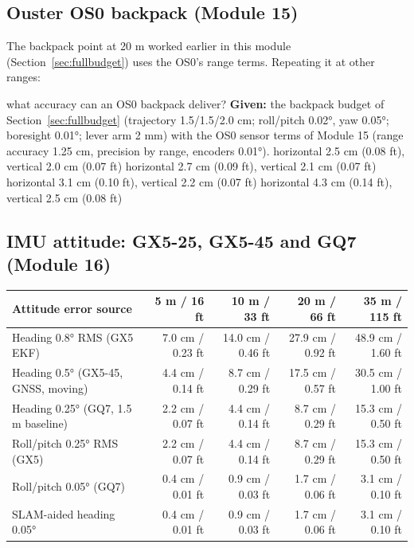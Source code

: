 \subsection{Ouster OS0 backpack (Module 15)}\label{sec:bud-os0}
The backpack point at 20 m worked earlier in this module (Section~\ref{sec:fullbudget}) uses the OS0's range terms. Repeating it at other ranges:

\begin{worked}{what accuracy can an OS0 backpack deliver?}
\textbf{Given:} the backpack budget of Section~\ref{sec:fullbudget} (trajectory 1.5/1.5/2.0 cm; roll/pitch 0.02°, yaw 0.05°; boresight 0.01°; lever arm 2 mm) with the OS0 sensor terms of Module 15 (range accuracy 1.25 cm, precision by range, encoders 0.01°).
 horizontal 2.5 cm (0.08 ft), vertical 2.0 cm (0.07 ft)
 horizontal 2.7 cm (0.09 ft), vertical 2.1 cm (0.07 ft)
 horizontal 3.1 cm (0.10 ft), vertical 2.2 cm (0.07 ft)
 horizontal 4.3 cm (0.14 ft), vertical 2.5 cm (0.08 ft)
\end{worked}


\subsection{IMU attitude: GX5-25, GX5-45 and GQ7 (Module 16)}\label{sec:bud-imu}


\begin{center}\footnotesize
\setlength{\tabcolsep}{3pt}\begin{tabular}{lrrrr}\toprule
\textbf{Attitude error source} & \textbf{5 m / 16 ft} & \textbf{10 m / 33 ft} & \textbf{20 m / 66 ft} & \textbf{35 m / 115 ft}\\\midrule
Heading 0.8° RMS (GX5 EKF) & 7.0 cm / 0.23 ft & 14.0 cm / 0.46 ft & 27.9 cm / 0.92 ft & 48.9 cm / 1.60 ft\\
Heading 0.5° (GX5-45, GNSS, moving) & 4.4 cm / 0.14 ft & 8.7 cm / 0.29 ft & 17.5 cm / 0.57 ft & 30.5 cm / 1.00 ft\\
Heading 0.25° (GQ7, 1.5 m baseline) & 2.2 cm / 0.07 ft & 4.4 cm / 0.14 ft & 8.7 cm / 0.29 ft & 15.3 cm / 0.50 ft\\
Roll/pitch 0.25° RMS (GX5) & 2.2 cm / 0.07 ft & 4.4 cm / 0.14 ft & 8.7 cm / 0.29 ft & 15.3 cm / 0.50 ft\\
Roll/pitch 0.05° (GQ7) & 0.4 cm / 0.01 ft & 0.9 cm / 0.03 ft & 1.7 cm / 0.06 ft & 3.1 cm / 0.10 ft\\
SLAM-aided heading 0.05° & 0.4 cm / 0.01 ft & 0.9 cm / 0.03 ft & 1.7 cm / 0.06 ft & 3.1 cm / 0.10 ft\\\bottomrule
\end{tabular}\end{center}

